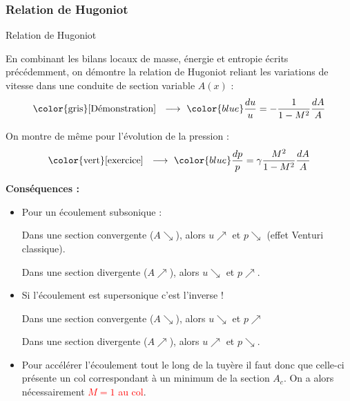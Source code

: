 \subsubsection{Relation de Hugoniot}
\begin{frame}{Relation de Hugoniot}

\small

En combinant les bilans locaux de masse, énergie et entropie écrits précédemment, on démontre la relation de \textcolor{vert}{Hugoniot}
reliant les variations de vitesse dans une conduite de section variable $A(x)$ :
\[
	\mbox{\color{gris} [Démonstration] \; $\longrightarrow$ \;}
	\color{blue}
	\frac{du}{u}  =  -\frac{1}{1-M^2} \frac{dA}{A}
\]

On montre de même pour l'évolution de la pression : 
\[
	\mbox{\color{vert} [exercice] \; $\longrightarrow$ \;}
	\color{blue}
	\frac{dp}{p} = \gamma \frac{M^2}{1-M^2} \frac{dA}{A} 
\]

\pause

\textbf{Conséquences :} %


\begin{itemize}
\item Pour un écoulement subsonique : 

Dans une section {\color{blue} convergente ($A \searrow $), alors $u \nearrow$} et $p \searrow$ (effet Venturi classique). 

Dans une section divergente ($A \nearrow $), alors $u \searrow$ et $p \nearrow$.
\pause
\medskip

\item Si l'écoulement est supersonique c'est l'inverse !

Dans une section convergente ($A \searrow $), alors $u \searrow$ et $p \nearrow$ 

Dans une section {\color{blue} divergente ($A \nearrow $), alors $u \nearrow$} et $p \searrow$.

\pause 
\medskip

\item Pour accélérer l'écoulement tout le long de la tuyère il faut donc que celle-ci présente un {\color{blue} col} correspondant à un minimum de la section $A_c$. On a alors nécessairement \textcolor{red}{$M=1$ au col}.%


\end{itemize}
\end{frame}
